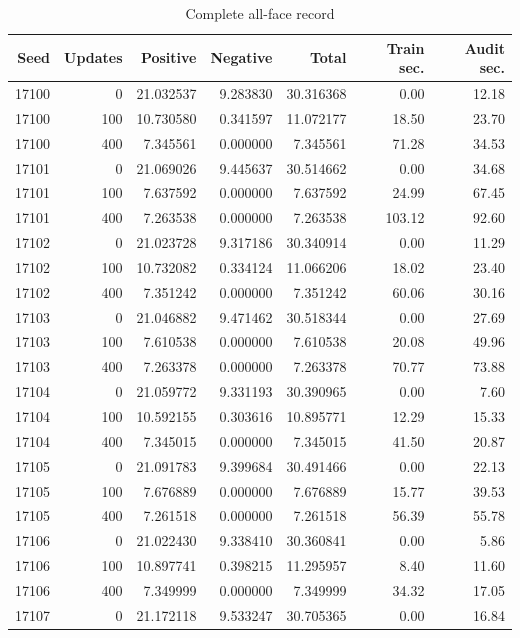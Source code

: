 \begin{table}[p]\centering\footnotesize
\caption{Complete all-face record}\label{supp:table-allface}
\begin{tabular}{rrrrrrr}\toprule
Seed & Updates & Positive & Negative & Total & Train sec. & Audit sec.\\
\midrule
17100 & 0 & 21.032537 & 9.283830 & 30.316368 & 0.00 & 12.18 \\
17100 & 100 & 10.730580 & 0.341597 & 11.072177 & 18.50 & 23.70 \\
17100 & 400 & 7.345561 & 0.000000 & 7.345561 & 71.28 & 34.53 \\
17101 & 0 & 21.069026 & 9.445637 & 30.514662 & 0.00 & 34.68 \\
17101 & 100 & 7.637592 & 0.000000 & 7.637592 & 24.99 & 67.45 \\
17101 & 400 & 7.263538 & 0.000000 & 7.263538 & 103.12 & 92.60 \\
17102 & 0 & 21.023728 & 9.317186 & 30.340914 & 0.00 & 11.29 \\
17102 & 100 & 10.732082 & 0.334124 & 11.066206 & 18.02 & 23.40 \\
17102 & 400 & 7.351242 & 0.000000 & 7.351242 & 60.06 & 30.16 \\
17103 & 0 & 21.046882 & 9.471462 & 30.518344 & 0.00 & 27.69 \\
17103 & 100 & 7.610538 & 0.000000 & 7.610538 & 20.08 & 49.96 \\
17103 & 400 & 7.263378 & 0.000000 & 7.263378 & 70.77 & 73.88 \\
17104 & 0 & 21.059772 & 9.331193 & 30.390965 & 0.00 & 7.60 \\
17104 & 100 & 10.592155 & 0.303616 & 10.895771 & 12.29 & 15.33 \\
17104 & 400 & 7.345015 & 0.000000 & 7.345015 & 41.50 & 20.87 \\
17105 & 0 & 21.091783 & 9.399684 & 30.491466 & 0.00 & 22.13 \\
17105 & 100 & 7.676889 & 0.000000 & 7.676889 & 15.77 & 39.53 \\
17105 & 400 & 7.261518 & 0.000000 & 7.261518 & 56.39 & 55.78 \\
17106 & 0 & 21.022430 & 9.338410 & 30.360841 & 0.00 & 5.86 \\
17106 & 100 & 10.897741 & 0.398215 & 11.295957 & 8.40 & 11.60 \\
17106 & 400 & 7.349999 & 0.000000 & 7.349999 & 34.32 & 17.05 \\
17107 & 0 & 21.172118 & 9.533247 & 30.705365 & 0.00 & 16.84 \\

\end{tabular}
\end{table}
